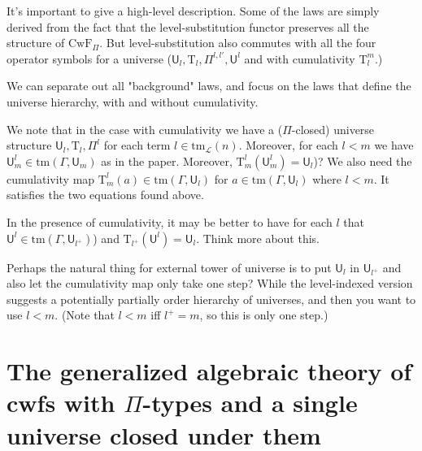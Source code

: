 \documentclass[11pt,a4paper]{article}
\theoremstyle{definition}
\newcommand{\Tm}{\mathrm{Tm}}
\def\Tm{\mathrm{tm}}
\newcommand{\tm}{\mathrm{tm}}
\def\U{\mathsf{U}}
\newcommand{\Ta}{\mathrm{T}}
\def\L{{\mathcal{L}}}
\def\CwF{\mathrm{CwF}}
\begin{document}
It's important to give a high-level description. Some of the laws are simply derived from the fact that the level-substitution functor preserves all the structure of $\CwF_\Pi$. But level-substitution also commutes with all the four operator symbols for a universe ($\U_l, \Ta_l, \Pi^{l,l'},\U^{l}$ and with cumulativity $\Ta^m_l$.)

We can separate out all "background" laws, and focus on the laws that define the universe hierarchy, with and without cumulativity.

We note that in the case with cumulativity we have a ($\Pi$-closed) universe structure $\U_l, \Ta_l, \Pi^{l}$ for each term $l \in \tm_\L(n)$. Moreover, for each $l<m$ we have $\U^l_m \in \Tm(\Gamma,\U_{m})$ as in the paper. Moreover, %
$\Ta^l_{m}(\U^l_m) = \U_l$)? We also need the cumulativity map $\Ta^l_m(a) \in \Tm(\Gamma,\U_l)$ for $a \in \Tm(\Gamma,\U_l)$ where $l  < m$. It satisfies the two equations found above.

In the presence of cumulativity, it may be better to have for each $l$ that $\U^l \in \Tm(\Gamma,\U_{l^+})$) and $\Ta_{l^+}(\U^l) = \U_l$. Think more about this.

Perhaps the natural thing for external tower of universe is to put $\U_l$ in $\U_{l^+}$ and also let the cumulativity map only take one step? While the level-indexed version suggests a potentially partially order hierarchy of universes, and then you want to use $l < m$. (Note that $l < m$ iff $l^+ = m$, so this is only one step.)

\appendix
\section{The generalized algebraic theory of cwfs with $\Pi$-types and a single universe closed under them}\label{sec:gatPiU}
\end{document}
